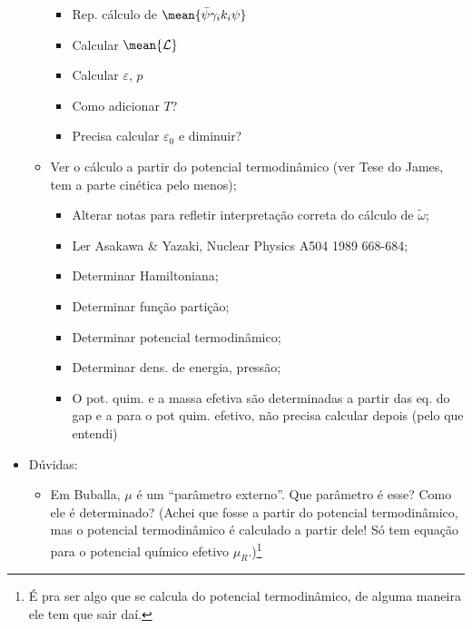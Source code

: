 \begin{itemize}
\begin{itemize}
\begin{itemize}
					\item Rep. cálculo de $\mean{\bar\psi\gamma_i k_i\psi}$
					\item Calcular $\mean{\mathcal{L}}$
					\item Calcular $\varepsilon$, $p$
					\item Como adicionar $T$?
					\item Precisa calcular $\varepsilon_0$ e diminuir?
				\end{itemize}
			\item Ver o cálculo a partir do potencial termodinâmico (ver Tese do James, tem a parte cinética pelo menos);
				\begin{itemize}
					\item[\checkmark] Alterar notas para refletir interpretação correta do cálculo de $\tilde{\omega}$;
					\item Ler Asakawa \& Yazaki, Nuclear Physics A504 1989 668-684;
					\item Determinar Hamiltoniana;
					\item Determinar função partição;
					\item Determinar potencial termodinâmico;
					\item Determinar dens. de energia, pressão;
					\item O pot. quim. e a massa efetiva são determinadas a partir das eq. do gap e a para o pot quim. efetivo, não precisa calcular depois (pelo que entendi)
				\end{itemize}
		\end{itemize}
	\item Dúvidas:
		\begin{itemize}
			\item Em Buballa\cite{Buballa1996}, $\mu$ é um ``parâmetro externo''. Que parâmetro é esse? Como ele é determinado? (Achei que fosse a partir do potencial termodinâmico, mas o potencial termodinâmico é calculado a partir dele! Só tem equação para o potencial químico efetivo $\mu_R$.)\footnote{É pra ser algo que se calcula do potencial termodinâmico, de alguma maneira ele tem que sair daí.}
		\end{itemize}
\end{itemize}
